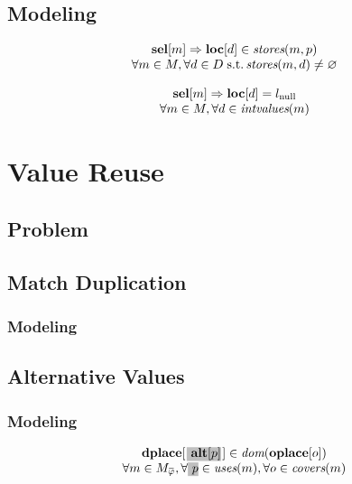 \subsection{Modeling}

\begin{equation}
  \begin{array}{c}
    \mVar{sel}[m]
    \mImp
    \mVar{loc}[d] \in \mStores(m, p) \\
    \forall m \in \mMatchSet,
    \forall d \in \mDataSet \;\text{s.t.} \mStores(m, d) \neq \mEmptySet
  \end{array}
  \labelEquation{valid-locations}
\end{equation}

\begin{equation}
  \begin{array}{c}
    \mVar{sel}[m]
    \mImp
    \mVar{loc}[d] = \mNullLocation \\
    \forall m \in \mMatchSet,
    \forall d \in \mIntValues(m)
  \end{array}
  \labelEquation{locs-of-intermediate-values}
\end{equation}



\section{Value Reuse}
\subsection{Problem}
\subsection{Match Duplication}
\subsubsection{Modeling}
\subsection{Alternative Values}
\subsubsection{Modeling}

\begin{equation}
  \begin{array}{c}
    \mVar{dplace}[\hlDiff{\mVar{alt}[p]}[1pt]] \in \mDom(\mVar{oplace}[o]) \\
    \forall m \in \mMatchCompSet{\mPhi},
    \forall \hlDiff{p} \in \mUses(m),
    \forall o \in \mCovers(m)
  \end{array}
  \labelEquation{dom}
\end{equation}

